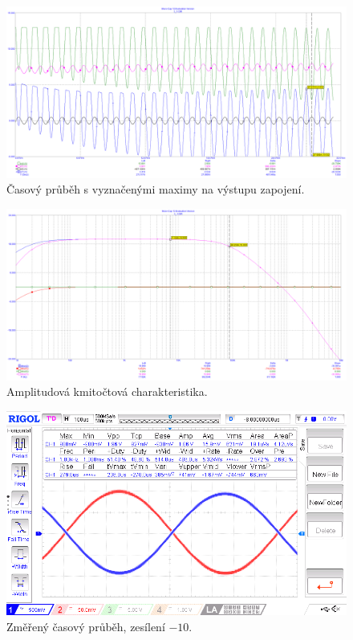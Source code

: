 \documentclass{article}
\begin{document}
\begin{figure}[H]
  \begin{minipage}[t]{\textwidth}
    \centering
    \includegraphics[width=\textwidth]{PC/ukol1/transient7.png}
    Časový průběh s vyznačenými maximy na výstupu zapojení.
  \end{minipage}
\end{figure}

\begin{figure}[H]
  \begin{minipage}[t]{\textwidth}
    \centering
    \includegraphics[width=\textwidth]{PC/ukol1/AC2.png}
    Amplitudová kmitočtová charakteristika.
  \end{minipage}
\end{figure}

\begin{figure}[H]
  \begin{minipage}[t]{\textwidth}
    \centering
    \includegraphics[width=\textwidth]{LAB/NewFile2.png}
    Změřený časový průběh, zesílení \(-10\).
  \end{minipage}
\end{figure}
\end{document}
